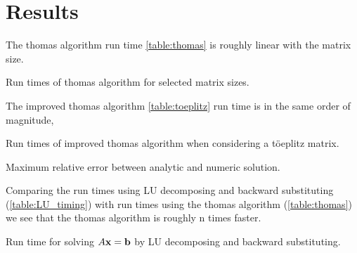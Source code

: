 \section*{Results}


The thomas algorithm run time \cref{table:thomas} is roughly linear with the
matrix size.

\begin{table}[h]
  \centering
  \caption{Run times of thomas algorithm for selected matrix sizes.}
  \label{table:thomas}
\end{table}

The improved thomas algorithm \cref{table:toeplitz} run time is in the same
order of magnitude,

\begin{table}[h]
  \centering
  \caption{Run times of improved thomas algorithm when considering a töeplitz matrix.}
  \label{table:toeplitz}
\end{table}

\begin{table}[h]
  \centering
  \caption{Maximum relative error between analytic and numeric solution.}
  \label{table:relative_error}
\end{table}

Comparing the run times using LU decomposing and backward substituting
(\cref{table:LU_timing}) with run times using the thomas algorithm
(\cref{table:thomas}) we see that the thomas algorithm is roughly n times
faster.

\begin{table}[h]
  \centering
  \caption{Run time for solving $A\mathbf{x} = \mathbf{b}$ by LU decomposing and backward substituting.}
  \label{table:LU_timing}
\end{table}
